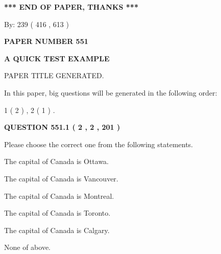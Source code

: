 \documentclass[12pt]{article}
\begin{document}
   
   
   
\vspace{1.0in} 
{\textbf{\large{ *** END OF PAPER, THANKS *** }}} 
   
   
\hspace{1.0in} By: 
 239 ( 416 ,  613 )
   
   
   
   
\newpage 
\setcounter{page}{ 
   551001 } 
   
   
   
   
 {\textbf{ \Large{ PAPER NUMBER  551  }}}
   
   
\vspace{0.2in}
   
   
   
   
   
   
   
   
 \vspace{0.2in}
{\LARGE {\textbf{ A QUICK TEST EXAMPLE}}}
   
   
 PAPER TITLE GENERATED.
   
   
   
\vspace{0.2in}
   
In this paper, big questions will be generated in the following order: 
   
   
   1 ( 2 )
 ,
   2 ( 1 )
 .
  
\vspace{0.2in}
  
{\textbf{\Large{QUESTION
551.1 
 ( 2 , 2 , 201 )
}}}
  
  
Please choose the correct one from the following statements.
 
 
The capital of Canada is Ottawa.
 
 
The capital of Canada is Vancouver.
 
 
The capital of Canada is Montreal.
 
 
The capital of Canada is Toronto.
 
 
The capital of Canada is Calgary.
 
 
 None of above.
 
 
\noindent{}
 
\end{document}
